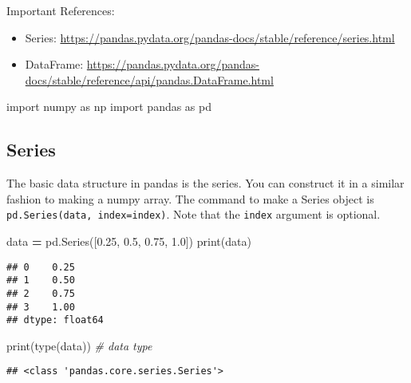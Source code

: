 \documentclass[
]{book}
\newenvironment{Shaded}{\begin{snugshade}}{\end{snugshade}}
\newcommand{\BuiltInTok}[1]{#1}
\newcommand{\CommentTok}[1]{\textcolor[rgb]{0.56,0.35,0.01}{\textit{#1}}}
\newcommand{\FloatTok}[1]{\textcolor[rgb]{0.00,0.00,0.81}{#1}}
\newcommand{\ImportTok}[1]{#1}
\newcommand{\NormalTok}[1]{#1}
\newcommand{\OperatorTok}[1]{\textcolor[rgb]{0.81,0.36,0.00}{\textbf{#1}}}
\begin{document}
Important References:

\begin{itemize}
\item
  Series: \url{https://pandas.pydata.org/pandas-docs/stable/reference/series.html}
\item
  DataFrame: \url{https://pandas.pydata.org/pandas-docs/stable/reference/api/pandas.DataFrame.html}
\end{itemize}

\begin{Shaded}
\begin{Highlighting}[]
\ImportTok{import}\NormalTok{ numpy }\ImportTok{as}\NormalTok{ np}
\ImportTok{import}\NormalTok{ pandas }\ImportTok{as}\NormalTok{ pd}
\end{Highlighting}
\end{Shaded}

\hypertarget{series}{%
\subsection{Series}\label{series}}

The basic data structure in pandas is the series. You can construct it in a similar fashion to making a numpy array. The command to make a Series object is
\texttt{pd.Series(data,\ index=index)}. Note that the \texttt{index} argument is optional.

\begin{Shaded}
\begin{Highlighting}[]
\NormalTok{data }\OperatorTok{=}\NormalTok{ pd.Series([}\FloatTok{0.25}\NormalTok{, }\FloatTok{0.5}\NormalTok{, }\FloatTok{0.75}\NormalTok{, }\FloatTok{1.0}\NormalTok{])}
\BuiltInTok{print}\NormalTok{(data)}
\end{Highlighting}
\end{Shaded}

\begin{verbatim}
## 0    0.25
## 1    0.50
## 2    0.75
## 3    1.00
## dtype: float64
\end{verbatim}

\begin{Shaded}
\begin{Highlighting}[]
\BuiltInTok{print}\NormalTok{(}\BuiltInTok{type}\NormalTok{(data)) }\CommentTok{\# data type}
\end{Highlighting}
\end{Shaded}

\begin{verbatim}
## <class 'pandas.core.series.Series'>
\end{verbatim}
\end{document}

